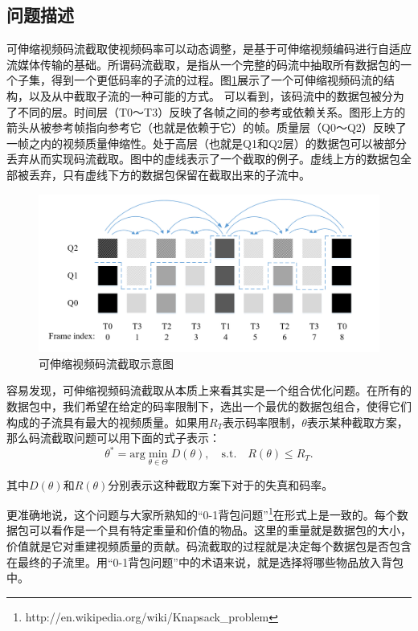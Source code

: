 \subsection{问题描述}

可伸缩视频码流截取使视频码率可以动态调整，是基于可伸缩视频编码进行自适应流媒体传输的基础。所谓码流截取，是指从一个完整的码流中抽取所有数据包的一个子集，得到一个更低码率的子流的过程。图\ref{fig:Bitstream-Extraction}展示了一个可伸缩视频码流的结构，以及从中截取子流的一种可能的方式。
可以看到，该码流中的数据包被分为了不同的层。时间层（T0～T3）反映了各帧之间的参考或依赖关系。图形上方的箭头从被参考帧指向参考它（也就是依赖于它）的帧。质量层（Q0～Q2）反映了一帧之内的视频质量伸缩性。处于高层（也就是Q1和Q2层）的数据包可以被部分丢弃从而实现码流截取。图中的虚线表示了一个截取的例子。虚线上方的数据包全部被丢弃，只有虚线下方的数据包保留在截取出来的子流中。

\begin{figure}[h]
\centering
\includegraphics[width = 0.9\linewidth]{./figures/Bitstream-Extraction.jpg}
\caption{可伸缩视频码流截取示意图\label{fig:Bitstream-Extraction}}
\end{figure}

容易发现，可伸缩视频码流截取从本质上来看其实是一个组合优化问题。在所有的数据包中，我们希望在给定的码率限制下，选出一个最优的数据包组合，使得它们构成的子流具有最大的视频质量。如果用$R_T$表示码率限制，$\theta$表示某种截取方案，那么码流截取问题可以用下面的式子表示：
\begin{equation}
{\theta}^* = \mathrm{arg} \min \limits_{\theta \in \Theta} D(\theta), \quad  \mathrm{s.t. } \quad R(\theta) \le R_T.
\end{equation}

其中$D(\theta)$和$R(\theta)$分别表示这种截取方案下对于的失真和码率。

更准确地说，这个问题与大家所熟知的“0-1背包问题”\footnote{http://en.wikipedia.org/wiki/Knapsack\_problem}在形式上是一致的。每个数据包可以看作是一个具有特定重量和价值的物品。这里的重量就是数据包的大小，价值就是它对重建视频质量的贡献。码流截取的过程就是决定每个数据包是否包含在最终的子流里。用“0-1背包问题”中的术语来说，就是选择将哪些物品放入背包中。

